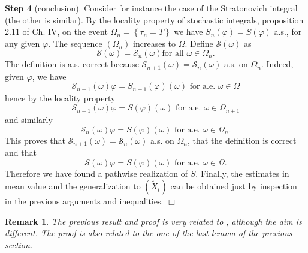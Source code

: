 \documentclass{article}
\newtheorem{remark}[theorem]{Remark}
\newenvironment{proof}[1][Proof]{{\sc #1.} }{\hfill $\Box$}
\begin{document}
\begin{proof}
\textbf{Step 4} (conclusion).  Consider for instance the case of the
Stratonovich integral (the other is similar). By the locality property of
stochastic integrals, \cite{RY} proposition 2.11 of Ch. IV, on the event $%
\Omega _{n}=\left\{ \tau _{n}=T\right\} $ we have $S_{n}\left( \varphi
\right) =S\left( \varphi \right) $ a.s., for any given $\varphi $. The
sequence $\left( \Omega _{n}\right) $ increases to $\Omega $. Define $%
\mathcal{S}\left( \omega \right) $ as 
\begin{equation*}
\mathcal{S}\left( \omega \right) =\mathcal{S}_{n}\left( \omega \right) \text{
for all }\omega \in \Omega _{n}\text{.}
\end{equation*}
The definition is a.s. correct because $\mathcal{S}_{n+1}\left( \omega
\right) =\mathcal{S}_{n}\left( \omega \right) $ a.s. on $\Omega _{n}$.
Indeed, given $\varphi $, we have 
\begin{equation*}
\mathcal{S}_{n+1}\left( \omega \right) \varphi =S_{n+1}\left( \varphi
\right) \left( \omega \right) \text{ for a.e. }\omega \in \Omega
\end{equation*}
hence by the locality property 
\begin{equation*}
\mathcal{S}_{n+1}\left( \omega \right) \varphi =S\left( \varphi \right)
\left( \omega \right) \text{ for a.e. }\omega \in \Omega _{n+1}
\end{equation*}
and similarly 
\begin{equation*}
\mathcal{S}_{n}\left( \omega \right) \varphi =S\left( \varphi \right) \left(
\omega \right) \text{ for a.e. }\omega \in \Omega _{n}.
\end{equation*}
This proves that $\mathcal{S}_{n+1}\left( \omega \right) =\mathcal{S}%
_{n}\left( \omega \right) $ a.s. on $\Omega _{n}$, that the definition is
correct and that 
\begin{equation*}
\mathcal{S}\left( \omega \right) \varphi =S\left( \varphi \right) \left(
\omega \right) \text{ for a.e. }\omega \in \Omega .
\end{equation*}
Therefore we have found a pathwise realization of $S$. Finally, the
estimates in mean value and the generalization to $( \tilde{X}%
_{t}) $ can be obtained just by inspection in the previous arguments
and inequalities.
\end{proof}

\begin{remark}
The previous result and proof is very related to \cite{FGub}, although the
aim is different. The proof is also related to the one of the last lemma of
the previous section.
\end{remark}
\end{document}
